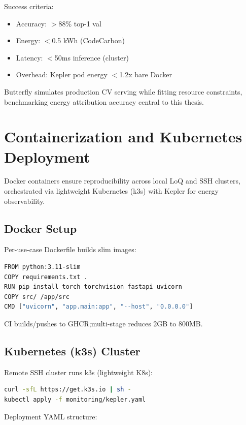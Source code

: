 Success criteria:
\begin{itemize}
    \item Accuracy: $>$88\% top-1 val
    \item Energy: $<$0.5 kWh (CodeCarbon)
    \item Latency: $<$50ms inference (cluster)
    \item Overhead: Kepler pod energy $<$1.2x bare Docker
\end{itemize}

Butterfly simulates production CV serving while fitting resource constraints, benchmarking energy attribution accuracy central to this thesis.\@

\section{Containerization and Kubernetes Deployment}

Docker containers ensure reproducibility across local LoQ and SSH clusters, orchestrated via lightweight Kubernetes (k3s) with Kepler for energy observability.

\subsection{Docker Setup}

Per-use-case Dockerfile builds slim images:

\begin{lstlisting}[language=Bash, basicstyle=\ttfamily\small]
FROM python:3.11-slim
COPY requirements.txt .
RUN pip install torch torchvision fastapi uvicorn
COPY src/ /app/src
CMD ["uvicorn", "app.main:app", "--host", "0.0.0.0"]
\end{lstlisting}

CI builds/pushes to GHCR;\@ multi-stage reduces 2GB to 800MB.\@

\subsection{Kubernetes (k3s) Cluster}

Remote SSH cluster runs k3s (lightweight K8s):

\begin{lstlisting}[language=Bash, basicstyle=\ttfamily\small]
curl -sfL https://get.k3s.io | sh -
kubectl apply -f monitoring/kepler.yaml
\end{lstlisting}

Deployment YAML structure:

